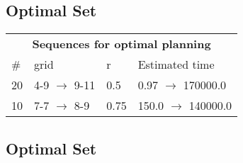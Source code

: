 \documentclass{article}
\begin{document}
                            \subsection*{Optimal Set}

                            \begin{center}
                            \begin{tabular}{l|l|l|l}
                            \multicolumn{4}{c}{\bf \large Sequences for optimal planning}\\
                            \# & grid & r & Estimated time\\\midrule
                            20&4-9 $\rightarrow$ 9-11&0.5&0.97 $\rightarrow$ 170000.0\\
10&7-7 $\rightarrow$ 8-9&0.75&150.0 $\rightarrow$ 140000.0
                            \end{tabular}
                            \end{center}
                    
                                \subsection*{Optimal Set}
                                
\end{document}
